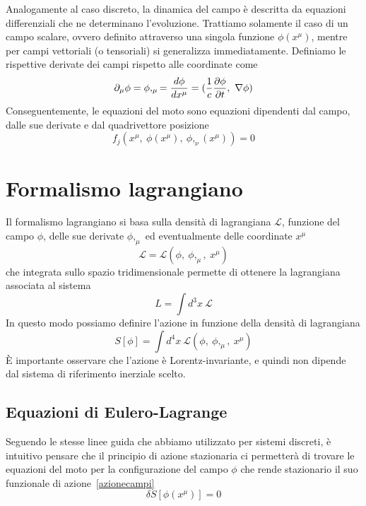     Analogamente al caso discreto, la dinamica del campo è descritta da equazioni differenziali che ne determinano l'evoluzione. Trattiamo solamente il caso di un campo scalare, ovvero definito attraverso una singola funzione $\phi(x^\mu)$, mentre per campi vettoriali (o tensoriali) si generalizza immediatamente. Definiamo le rispettive derivate dei campi rispetto alle coordinate come
    \begin{equation*}
        \partial_\mu \phi =  \phi,_\mu = \frac{d\phi}{dx^\mu} = (\frac{1}{c} \frac{\partial\phi}{\partial t}, ~ \nabla \phi)
    \end{equation*}
    Conseguentemente, le equazioni del moto sono equazioni dipendenti dal campo, dalle sue derivate e dal quadrivettore posizione
    \begin{equation} \label{motocampi}
        f_j(x^\mu, ~\phi(x^\mu), ~\phi,_\nu(x^\mu)) = 0
    \end{equation}

\section{Formalismo lagrangiano}    

    Il formalismo lagrangiano si basa sulla densità di lagrangiana $\mathcal L$, funzione del campo $\phi$, delle sue derivate $\phi,_\mu$ ed eventualmente delle coordinate $x^\mu$
    \begin{equation} \label{lagrangianacampi}
        \mathcal L = \mathcal L (\phi,~\phi,_\mu,~x^\mu)
    \end{equation}
    che integrata sullo spazio tridimensionale permette di ottenere la lagrangiana associata al sistema
    \begin{equation*}
        L = \int d^3 x ~ \mathcal L
    \end{equation*}
    In questo modo possiamo definire l'azione in funzione della densità di lagrangiana
    \begin{equation} \label{azionecampi}
        S[\phi] = \int d^4 x ~ \mathcal L (\phi,~\phi,_\mu,~x^\mu)
    \end{equation}
    È importante osservare che l'azione è Lorentz-invariante, e quindi non dipende dal sistema di riferimento inerziale scelto.

\subsection{Equazioni di Eulero-Lagrange}

    Seguendo le stesse linee guida che abbiamo utilizzato per sistemi discreti, è intuitivo pensare che il principio di azione stazionaria ci permetterà di trovare le equazioni del moto per la configurazione del campo $\phi$ che rende stazionario il suo funzionale di azione~\eqref{azionecampi}
    \begin{equation} \label{azionestazionariacampi}
        \delta S [\phi(x^\mu)] = 0
    \end{equation}

